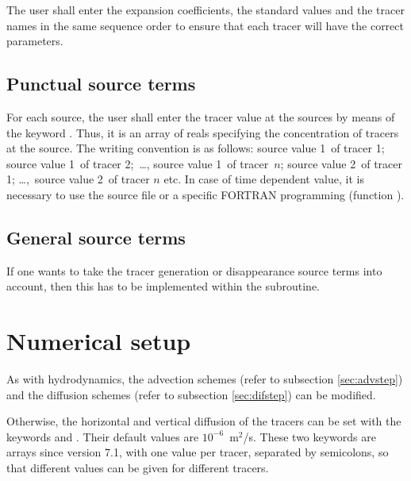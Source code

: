 The user shall enter the expansion coefficients, the standard values and the
tracer names in the same sequence order to ensure that each tracer will have
the correct parameters.

\subsection{Punctual source terms}

For each source, the user shall enter the tracer value at the sources by means
of the keyword . Thus, it is an
array of reals specifying the concentration of tracers at the source. The
writing convention is as follows: source value 1~of tracer 1; source value 1~of
tracer 2;~\dots , source value 1~of tracer~$n$; source value 2~of tracer
1; \dots ,~source value 2~of tracer $n$ etc. In case of time dependent
value, it is necessary to use the source file or a specific FORTRAN programming
(function ).


\subsection{General source terms}

If one wants to take the tracer generation or disappearance source terms into
account, then this has to be implemented within the 
subroutine.

\section{Numerical setup}

As with hydrodynamics, the advection schemes  (refer to subsection \ref{sec:advstep}) and the diffusion schemes
 (refer to subsection
\ref{sec:difstep}) can be modified.

Otherwise, the horizontal and vertical diffusion of the tracers can be set with
the keywords  and
. Their default values
are $10^{-6}$~m${}^{2}$/s.
These two keywords are arrays since version 7.1, with one value per tracer,
separated by semicolons, so that different values can be given for different
tracers.